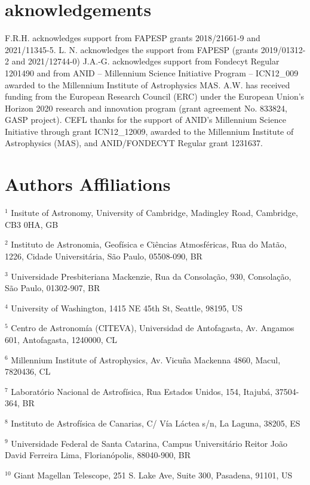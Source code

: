 \section*{aknowledgements}
F.R.H. acknowledges support from FAPESP grants 2018/21661-9 and 2021/11345-5.
L. N. acknowledges the support from FAPESP (grants 2019/01312-2 and 2021/12744-0)
J.A.-G. acknowledges support from Fondecyt Regular 1201490 and from ANID – Millennium Science Initiative Program – ICN12_009 awarded to the Millennium Institute of Astrophysics MAS.
A.W. has received funding from the European Research Council (ERC) under the European Union’s Horizon 2020 research and innovation program (grant agreement No. 833824, GASP project).
CEFL thanks for the support of ANID's Millennium Science Initiative through grant ICN12_12009, awarded to the Millennium Institute of Astrophysics (MAS), and ANID/FONDECYT Regular grant 1231637.


\section{Authors Affiliations}\label{ap:affiliations}

\noindent
$^{1}$ Insitute of Astronomy, University of Cambridge, Madingley Road, Cambridge, CB3 0HA, GB

\noindent
$^{2}$ Instituto de Astronomia, Geofísica e Ciências Atmosféricas, Rua do Matão, 1226, Cidade Universitária, São Paulo, 05508-090, BR

\noindent
$^{3}$ Universidade Presbiteriana Mackenzie, Rua da Consolação, 930, Consolação, São Paulo, 01302-907, BR

\noindent
$^{4}$ University of Washington, 1415 NE 45th St, Seattle, 98195, US

\noindent
$^{5}$ Centro de Astronomía (CITEVA), Universidad de Antofagasta, Av. Angamos 601, Antofagasta, 1240000, CL

\noindent
$^{6}$ Millennium Institute of Astrophysics, Av. Vicuña Mackenna 4860, Macul, 7820436, CL

\noindent
$^{7}$ Laboratório Nacional de Astrofísica, Rua Estados Unidos, 154, Itajubá, 37504-364, BR

\noindent
$^{8}$ Instituto de Astrofísica de Canarias, C/ Vía Láctea s/n, La Laguna, 38205, ES

\noindent
$^{9}$ Universidade Federal de Santa Catarina, Campus Universitário Reitor João David Ferreira Lima, Florianópolis, 88040-900, BR

\noindent
$^{10}$ Giant Magellan Telescope, 251 S. Lake Ave, Suite 300, Pasadena, 91101, US

